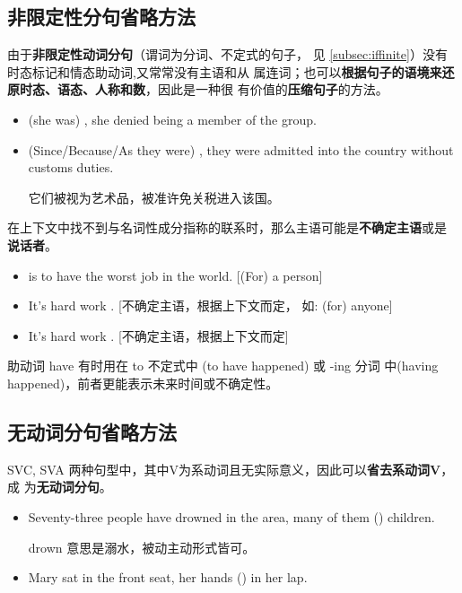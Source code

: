 \subsection{非限定性分句省略方法}


由于\textbf{非限定性动词分句}（谓词为分词、不定式的句子，
见 \cref{subsec:iffinite}）没有时态标记和情态助动词,又常常没有主语和从
属连词；也可以\textbf{根据句子的语境来还原时态、语态、人称和数}，因此是一种很
有价值的\textbf{压缩句子}的方法。

\begin{itemize}
\item {} (she was) , she denied being a member of the group.
\item (Since/Because/As they were) , they were
  admitted into the country without customs duties.

  它们被视为艺术品，被准许免关税进入该国。
\end{itemize}

在上下文中找不到与名词性成分指称的联系时，那么主语可能是\textbf{不确定主语}或是
\textbf{说话者}。
\begin{itemize}
\item {} is to have the worst job in the
  world. [(For) a person]
\item It's hard work . [不确定主语，根据上下文而定，
  如: (for) anyone]
\item It's hard work . [不确定主语，根据上下文而定]
\end{itemize}

助动词 have 有时用在 to 不定式中 (to have happened) 或 -ing 分词
中(having happened)，前者更能表示未来时间或不确定性。

\subsection{无动词分句省略方法}

SVC, SVA 两种句型中，其中V为系动词且无实际意义，因此可以\textbf{省去系动词V}，成
为\textbf{无动词分句}。

\begin{itemize}
\item Seventy-three people have drowned in the area, many of them
  () children.

  drown 意思是溺水，被动主动形式皆可。

\item  Mary sat in the front seat, her hands () in her lap.
\end{itemize}

